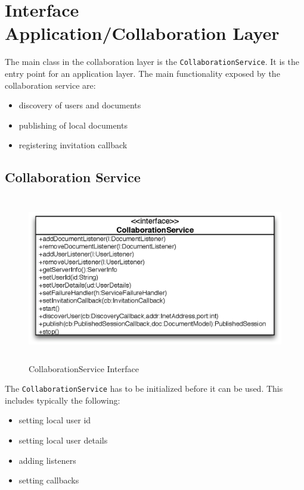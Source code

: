 \section{Interface Application/Collaboration Layer}
The main class in the collaboration layer is the \texttt{CollaborationService}.
It is the entry point for an application layer. The main functionality 
exposed by the collaboration service are:
\begin{itemize}
 \item discovery of users and documents
 \item publishing of local documents
 \item registering invitation callback
\end{itemize}


\subsection{Collaboration Service}

\begin{figure}[H]
 \centering
 \includegraphics[width=13.83cm,height=7.27cm]{../images/finalreport/architecture_collaborationservice_uml.eps}
 \caption{CollaborationService Interface}
\end{figure}

The \texttt{CollaborationService} has to be initialized before it can
be used. This includes typically the following:

\begin{itemize}
 \item setting local user id
 \item setting local user details
 \item adding listeners
 \item setting callbacks
\end{itemize}

